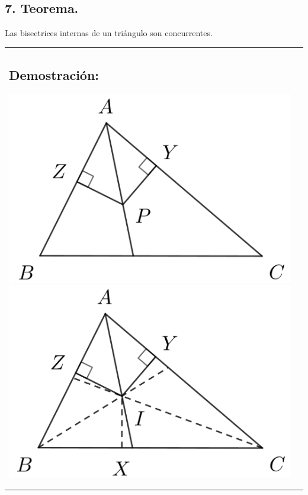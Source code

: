 \documentclass[12pt,a4paper]{article}
\begin{document}
\subsection*{7. Teorema.}
Las bisectrices internas de un triángulo son concurrentes.
\\
\begin{tabular}{p{15.9cm}p{1cm}}
\subsection*{Demostración:}
\begin{center}
\includegraphics[scale=0.5]{bisectriz.png} 
\includegraphics[scale=0.5]{bisectriz1.png} 
\end{center}
\end{tabular}
\\
\end{document}

